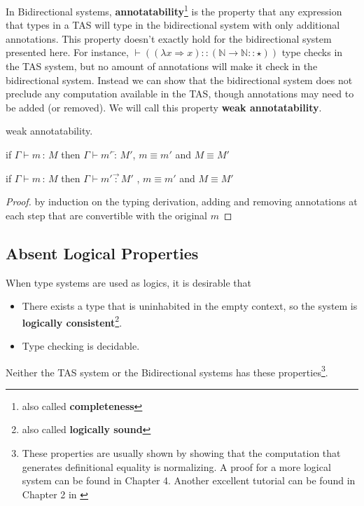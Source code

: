 In Bidirectional systems, \textbf{annotatability}\footnote{also called \textbf{completeness}} is the property that any expression that types in a \ac{TAS} will type in the bidirectional system with only additional annotations.
This property doesn't exactly hold for the bidirectional system presented here.
For instance, $\vdash\left((\lambda x\Rightarrow x)::\left(\mathbb{N}\rightarrow\mathbb{N}::\star\right)\right)$ type checks in the \ac{TAS} system, but no amount of annotations will make it check in the bidirectional system.
Instead we can show that the bidirectional system does not preclude any computation available in the \ac{TAS}, though annotations may need to be added (or removed).%
We will call this property \textbf{weak annotatability}.
\begin{thm}
weak annotatability.

if $\Gamma\vdash m\,:\,M$ then $\Gamma\vdash m'\overleftarrow{\,:\,}M'$, $m\equiv m'$ and $M\equiv M'$ 

if $\Gamma\vdash m\,:\,M$ then $\Gamma\vdash m'\overrightarrow{\,:\,}M'$ , $m\equiv m'$ and $M\equiv M'$
\end{thm}

\begin{proof}
by induction on the typing derivation, adding and removing annotations at each step that are convertible with the original $m$
\end{proof}

\subsection{Absent Logical Properties}

When type systems are used as logics, it is desirable that
\begin{itemize}
\item There exists a type that is uninhabited in the empty context, so the system is \textbf{logically consistent}\footnote{also called \textbf{logically sound}}.
\item Type checking is decidable.
\end{itemize}
Neither the \ac{TAS} system or the Bidirectional systems has these properties\footnote{These properties are usually shown by showing that the computation that generates definitional equality is normalizing.
A proof for a more logical system can be found in Chapter 4\cite{luo1994computation}.
Another excellent tutorial can be found in Chapter 2 in \cite{casinghino2014combiningthesis}}.

